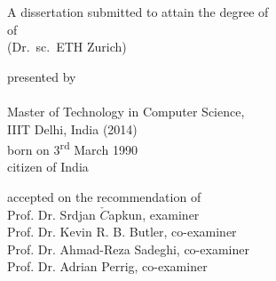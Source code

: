 \begin{titlepage}
    \begin{center}
        \large
        \begingroup
        \endgroup

        \hfill

        \vfill

        \begingroup
            \spacedallcaps{\myTitle}
        \endgroup

        \vfill

        \begingroup
            A dissertation submitted to attain the degree of\\
            \vspace{0.5em}
            of
             \\
            (Dr.\ sc.\ ETH Zurich)
        \endgroup

        \vfill

        \begingroup
            presented by\\
            \vspace{0.5em}
            \spacedallcaps{\myName}\\\vspace{0.5em}
            Master of Technology in Computer Science,\\ IIIT Delhi, India (2014)\\
            \vspace{0.5em}
            born on 3\textsuperscript{rd} March 1990\\
            citizen of India
        \endgroup

        \vfill

        \begingroup
            accepted on the recommendation of\\
            \vspace{0.5em}
            \ifreviewDraft
            Prof. Dr. Srdjan $\check{C}$apkun, examiner\\
			Prof. Dr. Kevin R. B. Butler, co-examiner\\
			Prof. Dr. Ahmad-Reza Sadeghi, co-examiner\\
			Prof. Dr. Adrian Perrig, co-examiner
			\fi
        \endgroup

        \vfill

        \myTime%

        \vfill
    \end{center}
\end{titlepage}
